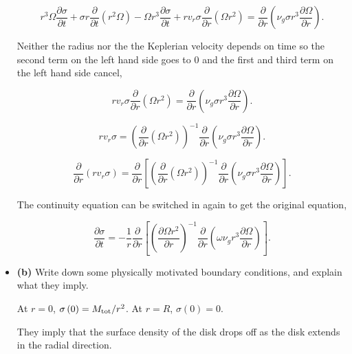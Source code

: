 \documentclass[12pt]{article}
\begin{document}
\begin{itemize}
\begin{equation}
r^3\Omega \frac{\partial \sigma}{\partial t} + \sigma r\frac{\partial}{\partial t}\left(r^2 \Omega\right) - \Omega r^3 \frac{\partial \sigma}{\partial t} + rv_r\sigma \frac{\partial}{\partial r}\left(\Omega r^2\right) = \frac{\partial}{\partial r}\left(\nu_g\sigma r^3 \frac{\partial \Omega}{\partial r}\right).
\end{equation}

Neither the radius nor the the Keplerian velocity depends on time so the second term on the left hand side goes to 0 and the first and third term on the left hand side cancel,  

\begin{equation}
 rv_r\sigma \frac{\partial}{\partial r}\left(\Omega r^2\right) = \frac{\partial}{\partial r}\left(\nu_g\sigma r^3 \frac{\partial \Omega}{\partial r}\right).
\end{equation}

\begin{equation}
 rv_r\sigma = \left(  \frac{\partial}{\partial r}\left(\Omega r^2\right)\right)^{-1}\frac{\partial}{\partial r}\left(\nu_g\sigma r^3 \frac{\partial \Omega}{\partial r}\right).
\end{equation}

\begin{equation}
 \frac{\partial}{\partial r} \left(rv_r\sigma\right) = \frac{\partial}{\partial r} \left[ \left(  \frac{\partial}{\partial r}\left(\Omega r^2\right)\right)^{-1}\frac{\partial}{\partial r}\left(\nu_g\sigma r^3 \frac{\partial \Omega}{\partial r}\right)\right].
\end{equation}

The continuity equation can be switched in again to get the original equation,

\begin{equation}
\frac{\partial \sigma}{\partial t} = - \frac{1}{r}\frac{\partial}{\partial r}\left[ \left(\frac{\partial \Omega r^2}{\partial r}\right)^{-1} \frac{\partial}{\partial r}\left( \omega \nu_g r^3 \frac{\partial \Omega}{\partial r}\right)\right].
\end{equation} 

\item \textbf{(b)} Write down some physically motivated boundary conditions, and explain what they imply.

At $r=0$, $\sigma\left(0\right) = M_{\rm tot}/r^2$.
At $r=R$, $\sigma\left(0\right) = 0$.

They imply that the surface density of the disk drops off as the disk extends in the radial direction.


\end{itemize}
\end{document}
